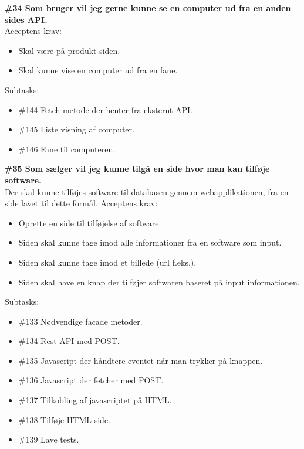 \documentclass[11pt]{report}
\begin{document}
\noindent\textbf{\#34 Som bruger vil jeg gerne kunne se en computer ud fra en anden sides API.}\\
\noindent Acceptens krav:
\begin{itemize}[topsep=0pt, partopsep=0pt]
  \item Skal være på produkt siden.
  \item Skal kunne vise en computer ud fra en fane. 
\end{itemize}
\noindent Subtasks:
\begin{itemize}[topsep=0pt, partopsep=0pt]
  \item \#144 Fetch metode der henter fra eksternt API.
  \item \#145 Liste visning af computer.
  \item \#146 Fane til computeren.
\end{itemize}

\noindent\textbf{\#35 Som sælger vil jeg kunne tilgå en side hvor man kan tilføje software.}\\
\noindent Der skal kunne tilføjes software til databasen gennem webapplikationen, fra en side lavet til dette formål.
\noindent Acceptens krav:
\begin{itemize}[topsep=0pt, partopsep=0pt]
  \item Oprette en side til tilføjelse af software.
  \item Siden skal kunne tage imod alle informationer fra en software som input.
  \item Siden skal kunne tage imod et billede (url f.eks.).
  \item Siden skal have en knap der tilføjer softwaren baseret på input informationen.
\end{itemize}
\noindent Subtasks:
\begin{itemize}[topsep=0pt, partopsep=0pt]
  \item \#133 Nødvendige facade metoder.
  \item \#134 Rest API med POST.
  \item \#135 Javascript der håndtere eventet når man trykker på knappen.
  \item \#136 Javascript der fetcher med POST.
  \item \#137 Tilkobling af javascriptet på HTML.
  \item \#138 Tilføje HTML side.
  \item \#139 Lave tests.
\end{itemize}
\end{document}
